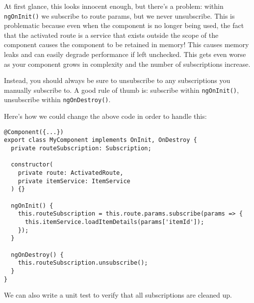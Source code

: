 At first glance, this looks innocent enough, but there’s a problem: within \lstinline{ngOnInit()} we subscribe to route params, but we never unsubscribe. This is problematic because even when the component is no longer being used, the fact that the activated route is a service that exists outside the scope of the component causes the component to be retained in memory! This causes memory leaks and can easily degrade performance if left unchecked. This gets even worse as your component grows in complexity and the number of subscriptions increase.

Instead, you should always be sure to unsubscribe to any subscriptions you manually subscribe to. A good rule of thumb is: subscribe within \lstinline{ngOnInit()}, unsubscribe within \lstinline{ngOnDestroy()}.

Here’s how we could change the above code in order to handle this:
\begin{lstlisting}
@Component({...})
export class MyComponent implements OnInit, OnDestroy {
  private routeSubscription: Subscription;

  constructor(
    private route: ActivatedRoute,
    private itemService: ItemService
  ) {}

  ngOnInit() {
    this.routeSubscription = this.route.params.subscribe(params => {
      this.itemService.loadItemDetails(params['itemId']);
    });
  }

  ngOnDestroy() {
    this.routeSubscription.unsubscribe();
  }
}  
\end{lstlisting}

We can also write a unit test to verify that all subscriptions are cleaned up.


